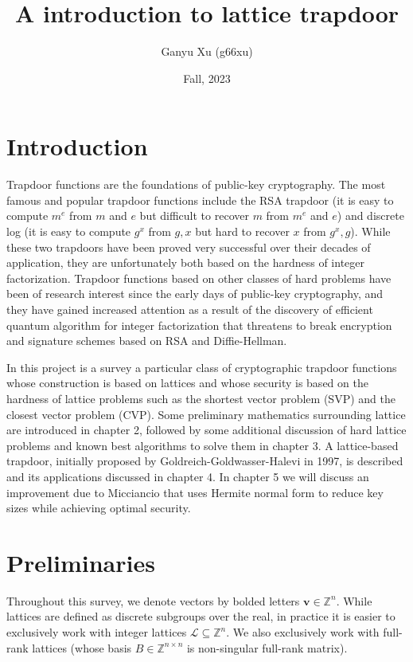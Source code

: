\documentclass[letterpaper,12pt]{article}
\title{A introduction to lattice trapdoor}
\author{Ganyu Xu (g66xu)}
\date{Fall, 2023}
\begin{document}
\maketitle

\section{Introduction}

Trapdoor functions are the foundations of public-key cryptography. The most famous and popular trapdoor functions include the RSA trapdoor (it is easy to compute $m^e$ from $m$ and $e$ but difficult to recover $m$ from $m^e$ and $e$) and discrete log (it is easy to compute $g^x$ from $g, x$ but hard to recover $x$ from $g^x, g$). While these two trapdoors have been proved very successful over their decades of application, they are unfortunately both based on the hardness of integer factorization. Trapdoor functions based on other classes of hard problems have been of research interest since the early days of public-key cryptography, and they have gained increased attention as a result of the discovery of efficient quantum algorithm for integer factorization that threatens to break encryption and signature schemes based on RSA and Diffie-Hellman.

In this project is a survey a particular class of cryptographic trapdoor functions whose construction is based on lattices and whose security is based on the hardness of lattice problems such as the shortest vector problem (SVP) and the closest vector problem (CVP). Some preliminary mathematics surrounding lattice are introduced in chapter 2, followed by some additional discussion of hard lattice problems and known best algorithms to solve them in chapter 3. A lattice-based trapdoor, initially proposed by Goldreich-Goldwasser-Halevi in 1997, is described and its applications discussed in chapter 4. In chapter 5 we will discuss an improvement due to Micciancio that uses Hermite normal form to reduce key sizes while achieving optimal security.


\section{Preliminaries}
Throughout this survey, we denote vectors by bolded letters $\mathbf{v} \in \mathbb{Z}^n$. While lattices are defined as discrete subgroups over the real, in practice it is easier to exclusively work with integer lattices $\mathcal{L} \subseteq \mathbb{Z}^n$. We also exclusively work with full-rank lattices (whose basis $B \in \mathbb{Z}^{n \times n}$ is non-singular full-rank matrix).
\end{document}
